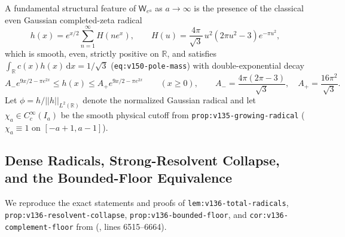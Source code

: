 \documentclass[11pt]{article}
\def\norm#1{||#1||}%
\theoremstyle{remark}
\newcommand{\norm}[1]{\left\lVert #1\right\rVert}
\newcommand{\dd}{\mathrm d}
\begin{document}
A fundamental structural feature of $\mathsf{W}_{e^a}$ as $a \to \infty$ is the presence of the classical even Gaussian completed-zeta radical
\begin{equation}\label{eq:gaussian-radical}
  h(x) = e^{x/2}\sum_{n=1}^\infty H(ne^x), \qquad H(u) = \frac{4\pi}{\sqrt{3}}\,u^2(2\pi u^2 - 3)e^{-\pi u^2},
\end{equation}
which is smooth, even, strictly positive on $\mathbb{R}$, and satisfies $\int_{\mathbb{R}} c(x)h(x)\,\dd x = 1/\sqrt{3}$ (\texttt{eq:v150-\allowbreak pole-\allowbreak mass}) with double-exponential decay
\begin{equation}\label{eq:v135-gaussian-tail}
  A_- e^{9x/2 - \pi e^{2x}} \le h(x) \le A_+ e^{9x/2 - \pi e^{2x}} \qquad (x \ge 0), \qquad A_- = \frac{4\pi(2\pi-3)}{\sqrt{3}}, \quad A_+ = \frac{16\pi^2}{\sqrt{3}}.
\end{equation}
Let $\phi = h/\norm{h}_{L^2(\mathbb{R})}$ denote the normalized Gaussian radical and let $\chi_a \in C_c^\infty(I_a)$ be the smooth physical cutoff from \texttt{prop:v135-\allowbreak growing-\allowbreak radical} ($\chi_a \equiv 1$ on $[-a+1, a-1]$).

\subsection{Dense Radicals, Strong-Resolvent Collapse, and the Bounded-Floor Equivalence}
We reproduce the exact statements and proofs of \texttt{lem:v136-\allowbreak total-\allowbreak radicals}, \texttt{prop:v136-\allowbreak resolvent-\allowbreak collapse}, \texttt{prop:v136-\allowbreak bounded-\allowbreak floor}, and \texttt{cor:v136-\allowbreak complement-\allowbreak floor} from  (, lines 6515--6664).
\end{document}
